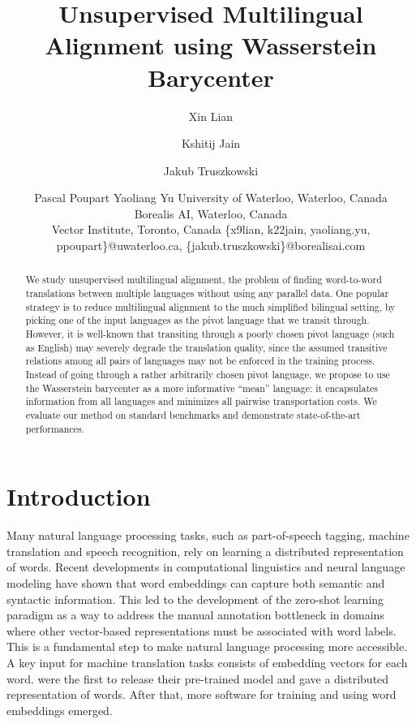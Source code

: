 \documentclass{article}
\title{Unsupervised Multilingual Alignment using Wasserstein Barycenter}
\author{
Xin Lian
\and
Kshitij Jain\and
Jakub Truszkowski \and
Pascal Poupart \And
Yaoliang Yu 
\affiliations
University of Waterloo, Waterloo, Canada\\
Borealis AI, Waterloo, Canada\\
Vector Institute, Toronto, Canada
\emails
\{x9lian, k22jain, yaoliang.yu, ppoupart\}@uwaterloo.ca,
\{jakub.truszkowski\}@borealisai.com
}
\begin{document}
\maketitle

\begin{abstract}
We study unsupervised multilingual alignment, the problem of finding word-to-word translations between multiple languages without using any parallel data. One popular strategy is to reduce multilingual alignment to the much simplified bilingual setting, by picking one of the input languages as the pivot language that we transit through. However, it is well-known that transiting through a poorly chosen pivot language (such as English) may severely degrade the translation quality, since the assumed transitive relations among all pairs of languages may not be enforced in the training process. 
Instead of going through a rather arbitrarily chosen pivot language, we propose to use the Wasserstein barycenter as a more informative ``mean'' language: it encapsulates information from all languages and minimizes all pairwise transportation costs. 
We evaluate our method on standard benchmarks and demonstrate state-of-the-art performances.

\end{abstract}



\section{Introduction}


Many natural language processing tasks, such as part-of-speech tagging, machine translation and speech recognition, rely on learning a distributed representation of words. Recent developments in computational linguistics and neural language modeling have shown that word embeddings can capture both semantic and syntactic information. This led to the development of the zero-shot learning paradigm as a way to address the manual annotation bottleneck in domains where other vector-based representations must be associated with word labels.
This is a fundamental step to make natural language processing more accessible. 
A key input for machine translation tasks consists of embedding vectors for each word.
\citet{MikolovSCCD13} were the first to release their pre-trained model and gave a distributed representation of words. After that, more software for training and using word embeddings emerged.
\end{document}

